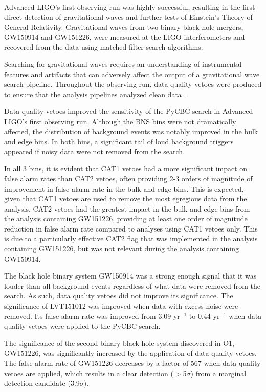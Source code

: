 Advanced LIGO's first observing run was highly successful, resulting in the first direct detection of 
gravitational waves and further tests of Einstein's Theory of General Relativity. Gravitational waves 
from two binary black hole mergers, GW150914 and GW151226, were measured at the LIGO interferometers 
and recovered from the data using matched filter search algorithms. 

Searching for gravitational waves requires an understanding of instrumental
features and artifacts that can adversely affect the output of a gravitational wave
search pipeline. Throughout the observing run, data quality vetoes were produced
to ensure that the analysis pipelines analyzed clean data \cite{GW150914-DETCHAR}.

Data quality vetoes improved the sensitivity of the PyCBC search in Advanced LIGO's first
observing run. Although the BNS bins were not dramatically affected, the distribution
of background events was notably improved in the bulk and edge bins.
In both bins, a significant tail of loud background triggers appeared
if noisy data were not removed from the search.

In all 3 bins, it is evident that CAT1 vetoes had a more significant impact on false alarm rates
than CAT2 vetoes, often providing 2-3 orders of magnitude of improvement in false alarm rate in the bulk
and edge bins. This is expected, given that CAT1 vetoes are used to remove the most egregious
data from the analysis. CAT2 vetoes had the greatest impact in the bulk and edge bins from the
analysis containing GW151226, providing at least one order of magnitude reduction in false alarm
rate compared to analyses using CAT1 vetoes only. This is due to a particularly effective CAT2 flag that
was implemented in the
analysis containing GW151226, but was not relevant during the analysis containing GW150914.

The black hole binary system GW150914 was a strong enough signal that it was louder than all background
events regardless of what data were removed from the search. As such, data quality vetoes did not
improve its significance.
The significance of LVT151012 was improved when data with excess noise were removed. Its
false alarm rate was improved from 3.09 $\mathrm{yr}^{-1}$ to 0.44 $\mathrm{yr}^{-1}$ when data quality vetoes were applied
to the PyCBC search.

The significance of the second binary black hole system discovered in O1, GW151226, was significantly
increased by the application of data quality vetoes. The false alarm rate of GW151226 decreases by a
factor of 567 when data quality vetoes are applied, which results in a clear detection ($>$5$\sigma$) from a
marginal detection candidate (3.9$\sigma$).
